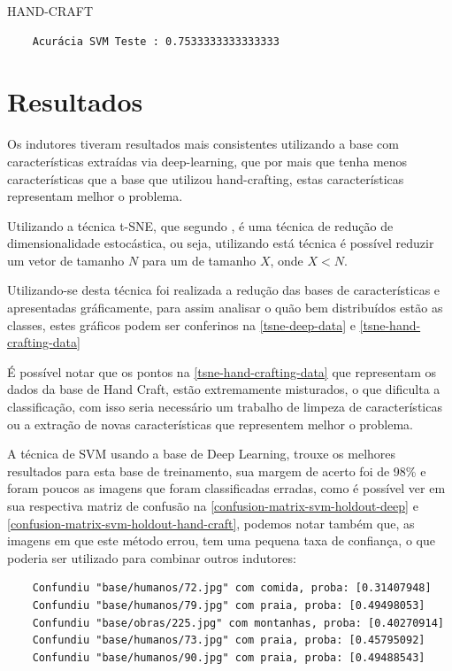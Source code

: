 \documentclass[
article,			%
11pt,				%
oneside,			%
a4paper,			%
english,			%
brazil,				%
sumario=tradicional,
]{abntex2}
\begin{document}
	HAND-CRAFT
	\begin{verbatim}
	Acurácia SVM Teste : 0.7533333333333333
	\end{verbatim}
	
	
	\section{Resultados}
	
	Os indutores tiveram resultados mais consistentes utilizando a base com características extraídas via deep-learning, que por mais que tenha menos características que a base que utilizou hand-crafting, estas características representam melhor o problema.
	
	Utilizando a técnica t-SNE, que segundo , é uma técnica de redução de dimensionalidade estocástica, ou seja, utilizando está técnica é possível reduzir um vetor de tamanho \(N\) para um de tamanho \(X\), onde \(X < N\).
	
	Utilizando-se desta técnica foi realizada a redução das bases de características e apresentadas gráficamente, para assim analisar o quão bem distribuídos estão as classes, estes gráficos podem ser conferinos na \autoref{tsne-deep-data} e \autoref{tsne-hand-crafting-data}
	
	É possível notar que os pontos na \autoref{tsne-hand-crafting-data} que representam os dados da base de Hand Craft, estão extremamente misturados, o que dificulta a classificação, com isso seria necessário um trabalho de limpeza de características ou a extração de novas características que representem melhor o problema.
	
	A técnica de SVM usando a base de Deep Learning, trouxe os melhores resultados para esta base de treinamento, sua margem de acerto foi de 98\% e foram poucos as imagens que foram classificadas erradas, como é possível ver em sua respectiva matriz de confusão na \autoref{confusion-matrix-svm-holdout-deep} e \autoref{confusion-matrix-svm-holdout-hand-craft}, podemos notar também que, as imagens em que este método errou, tem uma pequena taxa de confiança, o que poderia ser utilizado para combinar outros indutores:
	
	\begin{verbatim}
	Confundiu "base/humanos/72.jpg" com comida, proba: [0.31407948]
	Confundiu "base/humanos/79.jpg" com praia, proba: [0.49498053]
	Confundiu "base/obras/225.jpg" com montanhas, proba: [0.40270914]
	Confundiu "base/humanos/73.jpg" com praia, proba: [0.45795092]
	Confundiu "base/humanos/90.jpg" com praia, proba: [0.49488543]
	\end{verbatim} 
	
\end{document}
